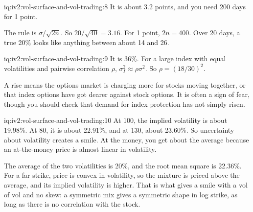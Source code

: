 \begin{solution}{iq:iv2:vol-surface-and-vol-trading:8}
It is about 3.2 points, and you need 200 days for 1 point.

The rule is $\sigma/\sqrt{2n}$. So $20/\sqrt{40} = 3.16$. For 1 point, $2n = 400$. Over 20 days, a true 20\% looks like anything between about 14 and 26.

\end{solution}

\begin{solution}{iq:iv2:vol-surface-and-vol-trading:9}
It is 36\%. For a large index with equal volatilities and pairwise correlation $\rho$, $\sigma_I^2 \approx \rho\sigma^2$. So $\rho = (18/30)^2$.

A rise means the options market is charging more for stocks moving together, or that index options have got dearer against stock options. It is often a sign of fear, though you should check that demand for index protection has not simply risen.

\end{solution}

\begin{solution}{iq:iv2:vol-surface-and-vol-trading:10}
At 100, the implied volatility is about 19.98\%. At 80, it is about 22.91\%, and at 130, about 23.60\%. So uncertainty about volatility creates a smile. At the money, you get about the average because an at-the-money price is almost linear in volatility.

The average of the two volatilities is 20\%, and the root mean square is 22.36\%. For a far strike, price is convex in volatility, so the mixture is priced above the average, and its implied volatility is higher. That is what gives a smile with a vol of vol and no skew: a symmetric mix gives a symmetric shape in log strike, as long as there is no correlation with the stock.

\end{solution}

